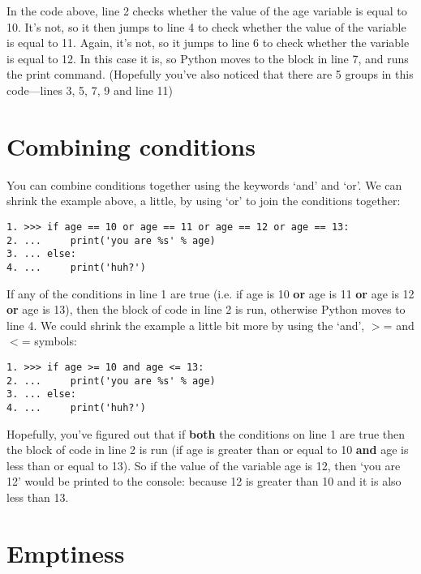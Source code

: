 In the code above, line 2 checks whether the value of the age variable is equal to 10.  It's not, so it then jumps to line 4 to check whether the value of the  variable is equal to 11.  Again, it's not, so it jumps to line 6 to check whether the variable is equal to 12.  In this case it is, so Python moves to the block in line 7, and runs the print command.  (Hopefully you've also noticed that there are 5 groups in this code---lines 3, 5, 7, 9 and line 11)

\section{Combining conditions}
You can combine conditions together using the keywords `and' and `or'.  We can shrink the example above, a little, by using `or' to join the conditions together:

\begin{listing}
\begin{verbatim}
1. >>> if age == 10 or age == 11 or age == 12 or age == 13:
2. ...     print('you are %s' % age)
3. ... else:
4. ...     print('huh?')
\end{verbatim}
\end{listing}

If any of the conditions in line 1 are true (i.e. if age is 10 \textbf{or} age is 11 \textbf{or} age is 12 \textbf{or} age is 13), then the block of code in line 2 is run, otherwise Python moves to line 4.  We could shrink the example a little bit more by using the `and', $>$= and $<$= symbols:

\begin{listing}
\begin{verbatim}
1. >>> if age >= 10 and age <= 13:
2. ...     print('you are %s' % age)
3. ... else:
4. ...     print('huh?')
\end{verbatim}
\end{listing}

Hopefully, you've figured out that if \textbf{both} the conditions on line 1 are true then the block of code in line 2 is run (if age is greater than or equal to 10 \textbf{and} age is less than or equal to 13). So if the value of the variable age is 12, then `you are 12' would be printed to the console:  because 12 is greater than 10 and it is also less than 13.

\section{Emptiness}

